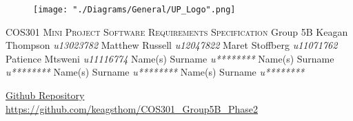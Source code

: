 \begin{titlepage}
\begin{center}
\begin{figure}[t]
\centering
\texttt{[image: "./Diagrams/General/UP\_Logo".png]}
\end{figure}
\begin{flushright}
\textsc{\LARGE COS301 Mini Project \newline\newline Software Requirements \newline   Specification}
\newline\newline \Large Group 5B \newline\newline
\large
Keagan Thompson    \emph{u13023782} \newline
Matthew Russell    \emph{u12047822} \newline
Maret Stoffberg    \emph{u11071762} \newline
Patience Mtsweni   \emph{u11116774} \newline
Name(s) Surname    \emph{u********} \newline
Name(s) Surname    \emph{u********} \newline
Name(s) Surname    \emph{u********} \newline
Name(s) Surname    \emph{u********} \newline
\end{flushright}
\vfill
\href{https://github.com/keagsthom/COS301_Group5B_Phase2}{Github Repository}\\
\url{https://github.com/keagsthom/COS301_Group5B_Phase2}
\end{center}
\end{titlepage}



